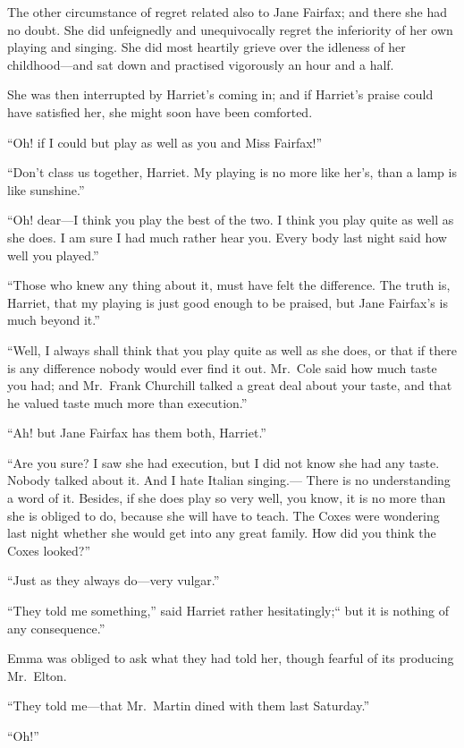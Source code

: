 The other circumstance of regret related also to Jane Fairfax;
and there she had no doubt.  She did unfeignedly and unequivocally
regret the inferiority of her own playing and singing.  She did
most heartily grieve over the idleness of her childhood---and sat
down and practised vigorously an hour and a half.

She was then interrupted by Harriet's coming in; and if Harriet's
praise could have satisfied her, she might soon have been comforted.

``Oh! if I could but play as well as you and Miss Fairfax!''

``Don't class us together, Harriet.  My playing is no more like
her's, than a lamp is like sunshine.''

``Oh! dear---I think you play the best of the two.  I think you play
quite as well as she does.  I am sure I had much rather hear you.
Every body last night said how well you played.''

``Those who knew any thing about it, must have felt the difference.
The truth is, Harriet, that my playing is just good enough to be praised,
but Jane Fairfax's is much beyond it.''

``Well, I always shall think that you play quite as well as she does,
or that if there is any difference nobody would ever find it out.
Mr.\ Cole said how much taste you had; and Mr.\ Frank Churchill talked
a great deal about your taste, and that he valued taste much more
than execution.''

``Ah! but Jane Fairfax has them both, Harriet.''

``Are you sure?  I saw she had execution, but I did not know she had
any taste.  Nobody talked about it.  And I hate Italian singing.---%
There is no understanding a word of it.  Besides, if she does play
so very well, you know, it is no more than she is obliged to do,
because she will have to teach.  The Coxes were wondering last night
whether she would get into any great family.  How did you think the
Coxes looked?''

``Just as they always do---very vulgar.''

``They told me something,'' said Harriet rather hesitatingly;``
but it is nothing of any consequence.''

Emma was obliged to ask what they had told her, though fearful
of its producing Mr.\ Elton.

``They told me---that Mr.\ Martin dined with them last Saturday.''

``Oh!''

